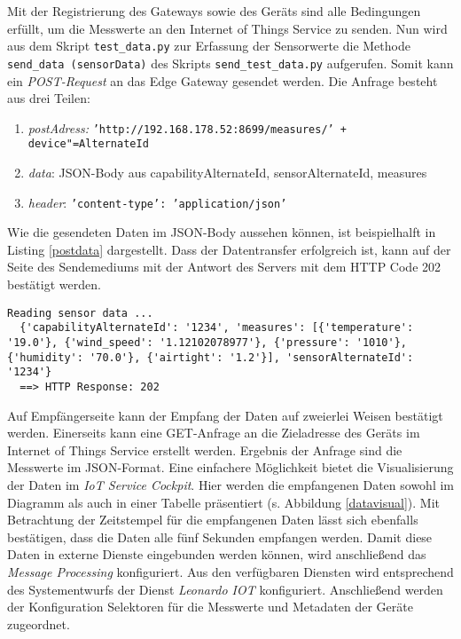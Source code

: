 Mit der Registrierung des Gateways sowie des Geräts sind alle Bedingungen erfüllt, um die Messwerte an den Internet of Things Service zu senden. Nun wird aus dem Skript \texttt{test\_data.py} zur Erfassung der Sensorwerte die Methode \texttt{send\_data (sensorData)} des Skripts \texttt{send\_test\_data.py} aufgerufen. Somit kann ein \textit{POST-Request} an das Edge Gateway gesendet werden. Die Anfrage besteht aus drei Teilen:
\begin{enumerate}
  \item \textit{postAdress:} \texttt{'http://192.168.178.52:8699/measures/' + device"=AlternateId}
  \item \textit{data}: JSON-Body aus capabilityAlternateId, sensorAlternateId, measures
  \item \textit{header}: \texttt{'content-type': 'application/json'}
\end{enumerate}

\noindent Wie die gesendeten Daten im JSON-Body aussehen können, ist beispielhalft in Listing \ref{postdata} dargestellt. Dass der Datentransfer erfolgreich ist, kann auf der Seite des Sendemediums mit der Antwort des Servers mit dem HTTP Code 202 bestätigt werden.

\begin{lstlisting}[caption= Das Data-Feld der POST-Anfrage, label=postdata]
  Reading sensor data ...
  {'capabilityAlternateId': '1234', 'measures': [{'temperature': '19.0'}, {'wind_speed': '1.12102078977'}, {'pressure': '1010'}, {'humidity': '70.0'}, {'airtight': '1.2'}], 'sensorAlternateId': '1234'}
  ==> HTTP Response: 202 \end{lstlisting}

\noindent Auf Empfängerseite kann der Empfang der Daten auf zweierlei Weisen bestätigt werden. Einerseits kann eine GET-Anfrage an die Zieladresse des Geräts im Internet of Things Service erstellt werden. Ergebnis der Anfrage sind die Messwerte im JSON-Format. Eine einfachere Möglichkeit bietet die Visualisierung der Daten im \textit{IoT Service Cockpit}. Hier werden die empfangenen Daten sowohl im Diagramm als auch in einer Tabelle präsentiert (s. Abbildung \ref{datavisual}). Mit Betrachtung der Zeitstempel für die empfangenen Daten lässt sich ebenfalls bestätigen, dass die Daten alle fünf Sekunden empfangen werden. Damit diese Daten in externe Dienste eingebunden werden können, wird anschließend das \textit{Message Processing} konfiguriert. Aus den verfügbaren Diensten wird entsprechend des Systementwurfs der Dienst \textit{\glqq Leonardo IOT\grqq{}} konfiguriert. Anschließend werden der Konfiguration Selektoren für die Messwerte und Metadaten der Geräte zugeordnet.

